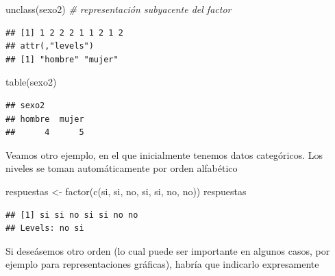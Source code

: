 \documentclass[
]{book}
\newenvironment{Shaded}{\begin{snugshade}}{\end{snugshade}}
\newcommand{\CommentTok}[1]{\textcolor[rgb]{0.56,0.35,0.01}{\textit{#1}}}
\newcommand{\FunctionTok}[1]{\textcolor[rgb]{0.00,0.00,0.00}{#1}}
\newcommand{\NormalTok}[1]{#1}
\newcommand{\OtherTok}[1]{\textcolor[rgb]{0.56,0.35,0.01}{#1}}
\newcommand{\StringTok}[1]{\textcolor[rgb]{0.31,0.60,0.02}{#1}}
\theoremstyle{break}
\begin{document}
\begin{Shaded}
\begin{Highlighting}[]
\FunctionTok{unclass}\NormalTok{(sexo2)  }\CommentTok{\# representación subyacente del factor}
\end{Highlighting}
\end{Shaded}

\begin{verbatim}
## [1] 1 2 2 2 1 1 2 1 2
## attr(,"levels")
## [1] "hombre" "mujer"
\end{verbatim}

\begin{Shaded}
\begin{Highlighting}[]
\FunctionTok{table}\NormalTok{(sexo2)}
\end{Highlighting}
\end{Shaded}

\begin{verbatim}
## sexo2
## hombre  mujer 
##      4      5
\end{verbatim}

Veamos otro ejemplo, en el que inicialmente tenemos datos categóricos. Los
niveles se toman automáticamente por orden alfabético

\begin{Shaded}
\begin{Highlighting}[]
\NormalTok{respuestas }\OtherTok{\textless{}{-}} \FunctionTok{factor}\NormalTok{(}\FunctionTok{c}\NormalTok{(}\StringTok{\textquotesingle{}si\textquotesingle{}}\NormalTok{, }\StringTok{\textquotesingle{}si\textquotesingle{}}\NormalTok{, }\StringTok{\textquotesingle{}no\textquotesingle{}}\NormalTok{, }\StringTok{\textquotesingle{}si\textquotesingle{}}\NormalTok{, }\StringTok{\textquotesingle{}si\textquotesingle{}}\NormalTok{, }\StringTok{\textquotesingle{}no\textquotesingle{}}\NormalTok{, }\StringTok{\textquotesingle{}no\textquotesingle{}}\NormalTok{))}
\NormalTok{respuestas}
\end{Highlighting}
\end{Shaded}

\begin{verbatim}
## [1] si si no si si no no
## Levels: no si
\end{verbatim}

Si deseásemos otro orden (lo cual puede ser importante en algunos casos, por ejemplo
para representaciones gráficas), habría que indicarlo expresamente
\end{document}
